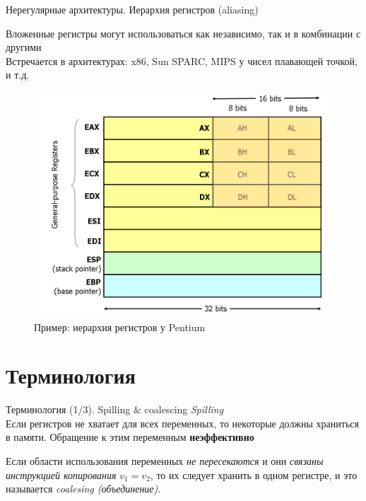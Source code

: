 \documentclass[aspectratio=169
  , xcolor={svgnames}
  , hyperref={ colorlinks,citecolor=DeepPink4
             , linkcolor=DarkRed,urlcolor=DarkBlue}
  , russian
  ]{beamer}
\theoremstyle{exerciseStyle1}
\begin{document}
\begin{frame}[fragile]{Нерегулярные архитектуры. Иерархия регистров (aliasing)}
\begin{minipage}{.4\textwidth}
Вложенные регистры могут использоваться как независимо, так и в комбинации с другими\\

Встречается в архитектурах: x86, Sun SPARC, MIPS у чисел плавающей точкой, и т.д.
\end{minipage}
\begin{minipage}{.58\textwidth}

\begin{figure}[h]
\includegraphics[scale=.35]{figures/x86-registers.png}
\caption{Пример: иерархия регистров у Pentium}
\end{figure}
\end{minipage}
\end{frame}

\section{Терминология}

\begin{frame}{Терминология (1/3). Spilling \& coalescing}
\emph{Spilling}\\
Если регистров не хватает для всех переменных, то некоторые должны храниться в памяти.
Обращение к этим переменным \textbf{неэффективно}\vspace{1cm}

Если области использования переменных \emph{не пересекаются} и они \emph{связаны инструкцией копирования} $v_1=v_2$, то их следует хранить в одном регистре, и это называется \emph{coalesing (объединение)}.
\end{frame}
\end{document}
